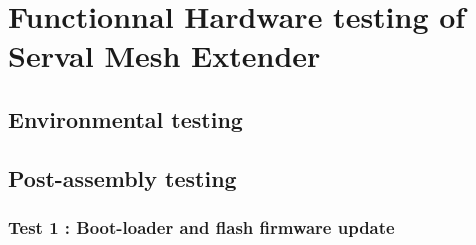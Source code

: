 \chapter{Functionnal Hardware testing of Serval Mesh Extender}


\section{Environmental testing}


\section{Post-assembly testing}

\subsection{Test 1 : Boot-loader and flash firmware update}

